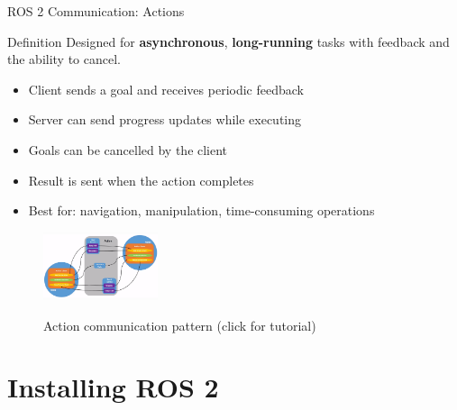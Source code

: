 \begin{frame}{ROS 2 Communication: Actions}
    \begin{block}{Definition}
        Designed for \textbf{asynchronous}, \textbf{long-running} tasks with feedback and the ability to cancel.
        \begin{itemize}
            \item Client sends a goal and receives periodic feedback
            \item Server can send progress updates while executing
            \item Goals can be cancelled by the client
            \item Result is sent when the action completes
            \item Best for: navigation, manipulation, time-consuming operations
        \end{itemize}
    \end{block}

    \begin{figure}
        \centering
        \href{https://docs.ros.org/en/foxy/Tutorials/Beginner-CLI-Tools/Understanding-ROS2-Actions/Understanding-ROS2-Actions.html}{%
            \includegraphics[width=0.3\textwidth]{img/ros2/ros2_communication_actions.png}%
        }
        \caption{Action communication pattern (click for tutorial)}
    \end{figure}
\end{frame}

\section{Installing ROS 2}

